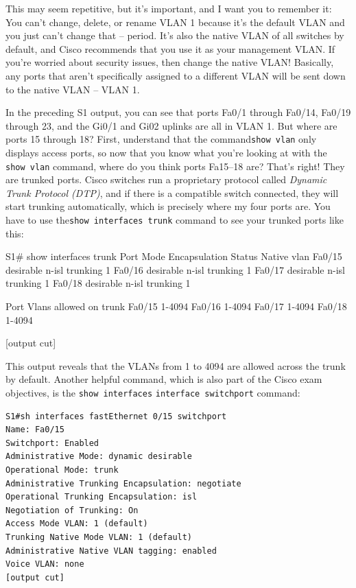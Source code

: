 This may seem repetitive, but it's important, and I want you to remember
it: You can't change, delete, or rename VLAN 1 because it's the default
VLAN and you just can't change that -- period. It's also the native VLAN
of all switches by default, and Cisco recommends that you use it as your
management VLAN. If you're worried about security issues, then change
the native VLAN! Basically, any ports that aren't specifically assigned
to a different VLAN will be sent down to the native VLAN -- VLAN 1.

In the preceding S1 output, you can see that ports Fa0/1 through Fa0/14,
Fa0/19 through 23, and the Gi0/1 and Gi02 uplinks are all in VLAN 1. But
where are ports 15 through 18? First, understand that the
command\texttt{show\ vlan} only displays access ports, so now that you
know what you're looking at with the \texttt{show\ vlan} command, where
do you think ports Fa15--18 are? That's right! They are trunked ports.
Cisco switches run a proprietary protocol called \emph{Dynamic Trunk
Protocol (DTP)}, and if there is a compatible switch connected, they
will start trunking automatically, which is precisely where my four
ports are. You have to use the\texttt{show\ interfaces\ trunk} command
to see your trunked ports like this:

\begin{cli}
S1# show interfaces trunk
Port        Mode             Encapsulation  Status        Native vlan
Fa0/15      desirable        n-isl          trunking      1
Fa0/16      desirable        n-isl          trunking      1
Fa0/17      desirable        n-isl          trunking      1
Fa0/18      desirable        n-isl          trunking      1
 
Port        Vlans allowed on trunk
Fa0/15      1-4094
Fa0/16      1-4094
Fa0/17      1-4094
Fa0/18      1-4094
 
[output cut]
\end{cli}

This output reveals that the VLANs from 1 to 4094 are allowed across the trunk by default.
Another helpful command, which is also part of the Cisco exam
objectives, is the \texttt{show\ interfaces}
\texttt{interface}\texttt{\ switchport} command:

\begin{verbatim}
S1#sh interfaces fastEthernet 0/15 switchport
Name: Fa0/15
Switchport: Enabled
Administrative Mode: dynamic desirable
Operational Mode: trunk
Administrative Trunking Encapsulation: negotiate
Operational Trunking Encapsulation: isl
Negotiation of Trunking: On
Access Mode VLAN: 1 (default)
Trunking Native Mode VLAN: 1 (default)
Administrative Native VLAN tagging: enabled
Voice VLAN: none
[output cut]
\end{verbatim}

